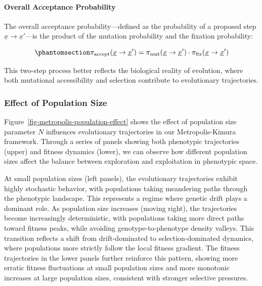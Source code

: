\documentclass[
]{scrartcl}
\let\oldparagraph\paragraph
\renewcommand{\paragraph}[1]{\oldparagraph{#1}\mbox{}}
\begin{document}
\begin{refsection}
\paragraph{Overall Acceptance
Probability}\label{overall-acceptance-probability}

The overall acceptance probability---defined as the probability of a
proposed step \(\underline{x} \rightarrow \underline{x}'\)---is the
product of the mutation probability and the fixation probability:

\begin{equation}\phantomsection\label{eq-overall-acceptance-probability}{
\pi_{\text{accept}}(\underline{x} \to \underline{x}') = 
\pi_{\text{mut}}(\underline{x} \to \underline{x}') \cdot 
\pi_{\text{fix}}(\underline{x} \to \underline{x}')
}\end{equation}

This two-step process better reflects the biological reality of
evolution, where both mutational accessibility and selection contribute
to evolutionary trajectories.

\subsubsection{Effect of Population
Size}\label{effect-of-population-size}

Figure~\ref{fig-metropolis-population-effect} shows the effect of
population size parameter \(N\) influences evolutionary trajectories in
our Metropolis-Kimura framework. Through a series of panels showing both
phenotypic trajectories (upper) and fitness dynamics (lower), we can
observe how different population sizes affect the balance between
exploration and exploitation in phenotypic space.

At small population sizes (left panels), the evolutionary trajectories
exhibit highly stochastic behavior, with populations taking meandering
paths through the phenotypic landscape. This represents a regime where
genetic drift plays a dominant role. As population size increases
(moving right), the trajectories become increasingly deterministic, with
populations taking more direct paths toward fitness peaks, while
avoiding genotype-to-phenotype density valleys. This transition reflects
a shift from drift-dominated to selection-dominated dynamics, where
populations more strictly follow the local fitness gradient. The fitness
trajectories in the lower panels further reinforce this pattern, showing
more erratic fitness fluctuations at small population sizes and more
monotonic increases at large population sizes, consistent with stronger
selective pressures.


\end{refsection}
\end{document}
